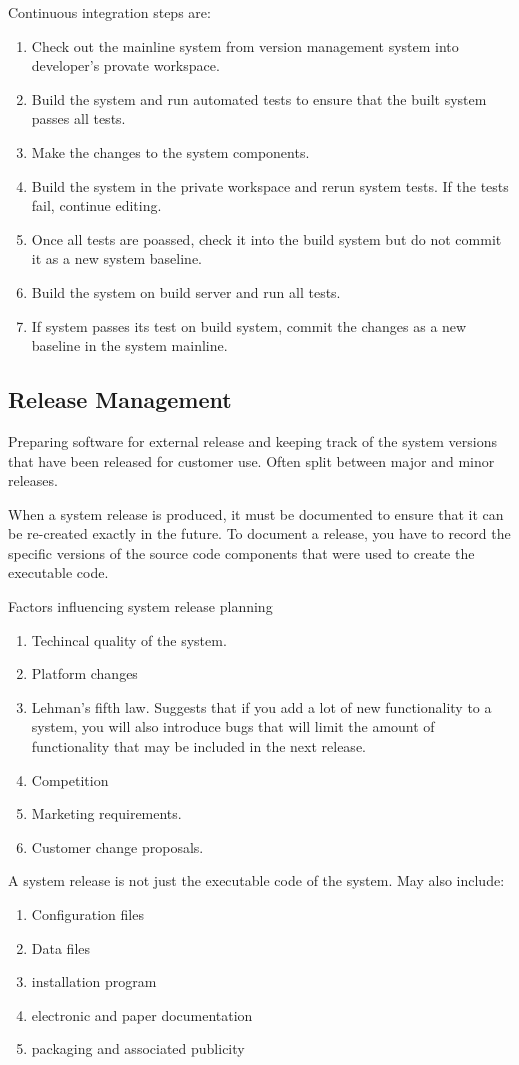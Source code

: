 \documentclass{article}
\begin{document}
Continuous integration steps are:
\begin{enumerate}
\item Check out the mainline system from version management system into developer's provate workspace.
\item Build the system and run automated tests to ensure that the built system passes all tests.
\item Make the changes to the system components.
\item Build the system in the private workspace and rerun system tests.  If the tests fail, continue editing.
\item Once all tests are poassed, check it into the build system but do not commit it as a new system baseline.
\item Build the system on build server and run all tests.
\item If system passes its test on build system, commit the changes as a new baseline in the system mainline.
\end{enumerate}

\subsection{Release Management}
Preparing software for external release and keeping track of the system versions that have been released for customer use.
Often split between major and minor releases.

When a system release is produced, it must be documented to ensure that it can be re-created exactly in the future.  To document a release, you have to record the specific versions of the source code components that were used to create the executable code.

Factors influencing system release planning
\begin{enumerate}
\item Techincal quality of the system.
\item Platform changes
\item Lehman's fifth law.  Suggests that if you add a lot of new functionality to a system, you will also introduce bugs that will limit the amount of functionality that may be included in the next release.
\item Competition
\item Marketing requirements.
\item Customer change proposals.
\end{enumerate}

A system release is not just the executable code of the system.  May also include:
\begin{enumerate}
\item Configuration files
\item Data files
\item installation program
\item electronic and paper documentation
\item packaging and associated publicity 
\end{enumerate}
\end{document}
